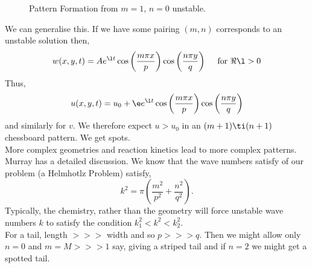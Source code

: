 \begin{figure}[!ht]
\centering
\resizebox{0.4\textwidth}{!}{}
\caption{Pattern Formation from $m = 1$, $n = 0$ unstable.}
\end{figure}

\noindent
We can generalise this. If we have some pairing $(m, n)$ corresponds to an unstable solution then,
$$ w(x, y, t) = Ae^{\l t} \cos \left( \frac{m\pi x}{p} \right)\cos \left( \frac{n\pi y}{q} \right) \quad \text{ for } \Re \l > 0$$
Thus,
$$ u(x, y, t) = u_0 + \e e^{\l t}\cos \left( \frac{m\pi x}{p} \right)\cos \left( \frac{n\pi y}{q} \right) $$
and similarly for $v$. We therefore expect $u > u_0$ in an $(m + 1) \ti (n + 1)$ chessboard pattern. We get spots.\\

\noindent
More complex geometries and reaction kinetics lead to more complex patterns. Murray has a detailed discussion. We know that the wave numbers satisfy of our problem (a Helmhotlz Problem) satisfy,
$$ k^2 = \pi \left( \frac{m^2}{p^2} + \frac{n^2}{q^2} \right). $$
Typically, the chemistry, rather than the geometry will force unstable wave numbers $k$ to satisfy the condition $k_1^2 < k^2 < k_2^2$. \\

\noindent
For a tail, length $>>>$ width and so $p >>> q$. Then we might allow only $n = 0$ and $m = M >>> 1$ say, giving a striped tail and if $n = 2$ we might get a spotted tail. 
